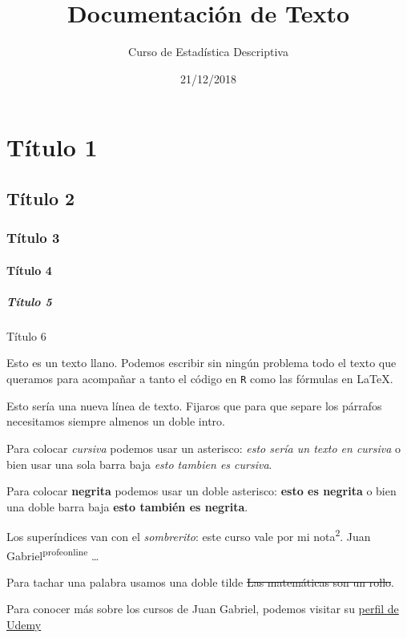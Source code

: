 \documentclass[]{article}
\title{Documentación de Texto}
\author{Curso de Estadística Descriptiva}
\date{21/12/2018}
\let\oldparagraph\paragraph
\renewcommand{\paragraph}[1]{\oldparagraph{#1}\mbox{}}
\let\oldsubparagraph\subparagraph
\renewcommand{\subparagraph}[1]{\oldsubparagraph{#1}\mbox{}}
\begin{document}
\maketitle

\hypertarget{tuxedtulo-1}{%
\section{Título 1}\label{tuxedtulo-1}}

\hypertarget{tuxedtulo-2}{%
\subsection{Título 2}\label{tuxedtulo-2}}

\hypertarget{tuxedtulo-3}{%
\subsubsection{Título 3}\label{tuxedtulo-3}}

\hypertarget{tuxedtulo-4}{%
\paragraph{Título 4}\label{tuxedtulo-4}}

\hypertarget{tuxedtulo-5}{%
\subparagraph{Título 5}\label{tuxedtulo-5}}

Título 6

Esto es un texto llano. Podemos escribir sin ningún problema todo el
texto que queramos para acompañar a tanto el código en \texttt{R} como
las fórmulas en \LaTeX.

Esto sería una nueva línea de texto. Fijaros que para que separe los
párrafos necesitamos siempre almenos un doble intro.

Para colocar \emph{cursiva} podemos usar un asterisco: \emph{esto sería
un texto en cursiva} o bien usar una sola barra baja \emph{esto tambien
es cursiva}.

Para colocar \textbf{negrita} podemos usar un doble asterisco:
\textbf{esto es negrita} o bien una doble barra baja \textbf{esto
también es negrita}.

Los superíndices van con el \emph{sombrerito}: este curso vale por mi
nota\textsuperscript{2}. Juan Gabriel\textsuperscript{profeonline}
\ldots{}

Para tachar una palabra usamos una doble tilde \sout{Las matemáticas son
un rollo}.

Para conocer más sobre los cursos de Juan Gabriel, podemos visitar su
\href{https://udemy.com/u/juangabriel2}{perfil de Udemy}
\end{document}
